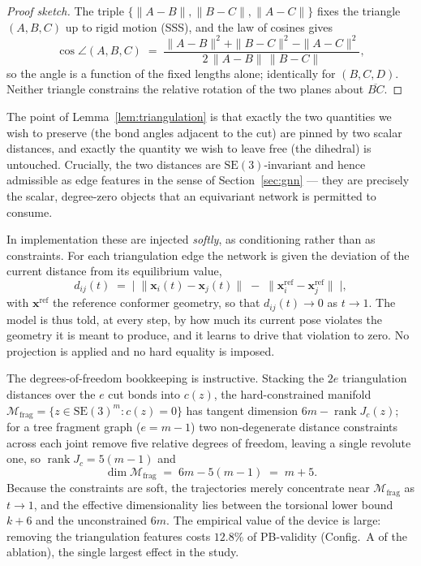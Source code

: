 \documentclass[a4paper,12pt]{article}
\theoremstyle{remark}
\begin{document}
\begin{proof}[Proof sketch]
The triple $\{\|A-B\|, \|B-C\|, \|A-C\|\}$ fixes the triangle $(A,B,C)$ up to rigid motion (SSS),
and the law of cosines gives
\[
  \cos\angle(A,B,C) \;=\; \frac{\|A-B\|^2 + \|B-C\|^2 - \|A-C\|^2}{2\,\|A-B\|\,\|B-C\|},
\]
so the angle is a function of the fixed lengths alone; identically for $(B,C,D)$. Neither triangle
constrains the relative rotation of the two planes about $\overline{BC}$.
\end{proof}

The point of Lemma~\ref{lem:triangulation} is that exactly the two quantities we wish to preserve
(the bond angles adjacent to the cut) are pinned by two scalar distances, and exactly the quantity
we wish to leave free (the dihedral) is untouched. Crucially, the two distances are
$\mathrm{SE}(3)$-invariant and hence admissible as edge features in the sense of
Section~\ref{sec:gnn} --- they are precisely the scalar, degree-zero objects that an equivariant
network is permitted to consume.

In implementation these are injected \emph{softly}, as conditioning rather than as constraints. For
each triangulation edge the network is given the deviation of the current distance from its
equilibrium value,
\begin{equation}
\label{eq:triangulation-feature}
  d_{ij}(t) \;=\; \Big|\; \|\mathbf{x}_i(t) - \mathbf{x}_j(t)\| \;-\; \|\mathbf{x}_i^{\mathrm{ref}} - \mathbf{x}_j^{\mathrm{ref}}\| \;\Big|,
\end{equation}
with $\mathbf{x}^{\mathrm{ref}}$ the reference conformer geometry, so that
$d_{ij}(t) \to 0$ as $t \to 1$. The model is thus told, at every step, by how much its current pose
violates the geometry it is meant to produce, and it learns to drive that violation to zero. No
projection is applied and no hard equality is imposed.

The degrees-of-freedom bookkeeping is instructive. Stacking the $2e$ triangulation distances over
the $e$ cut bonds into $c(z)$, the hard-constrained manifold
$\mathcal{M}_{\text{frag}} = \{ z \in \mathrm{SE}(3)^m : c(z) = 0 \}$ has tangent dimension
$6m - \operatorname{rank} J_c(z)$; for a tree fragment graph ($e = m-1$) two non-degenerate distance
constraints across each joint remove five relative degrees of freedom, leaving a single revolute
one, so $\operatorname{rank} J_c = 5(m-1)$ and
\[
  \dim \mathcal{M}_{\text{frag}} \;=\; 6m - 5(m-1) \;=\; m+5 .
\]
Because the constraints are soft, the trajectories merely concentrate near $\mathcal{M}_{\text{frag}}$
as $t \to 1$, and the effective dimensionality lies between the torsional lower bound $k+6$ and the
unconstrained $6m$. The empirical value of the device is large: removing the triangulation features
costs $12.8\%$ of PB-validity (Config.~A of the ablation), the single largest effect in the study.
\end{document}

